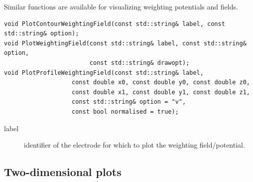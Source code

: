 Similar functions are available for visualizing weighting potentials and fields.
\begin{lstlisting}
void PlotContourWeightingField(const std::string& label, const std::string& option);
void PlotWeightingField(const std::string& label, const std::string& option,
                        const std::string& drawopt);
void PlotProfileWeightingField(const std::string& label,
                   const double x0, const double y0, const double z0,
                   const double x1, const double y1, const double z1,
                   const std::string& option = "v",
                   const bool normalised = true);
\end{lstlisting}
\begin{description}
  \item[label] identifier of the electrode for which to plot the weighting field/potential.
\end{description}

\subsection{Two-dimensional plots}

